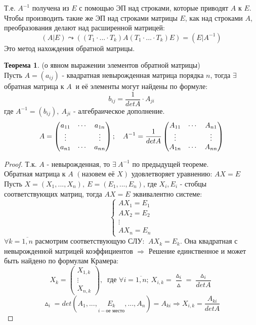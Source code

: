 \documentclass[a4paper, 12pt]{article}
\theoremstyle{definition}
\newtheorem*{theorem}{Теорема}
\begin{document}
  Т.е. $A^{-1}$ получена из $E$ с помощью ЭП над строками, которые приводят $A$ к $E$. \\
  Чтобы производить такие же ЭП над строками матрицы $E$, как над строками $A$, преобразования делают над расширенной матрицей:
  $$(A|E) \leadsto ((T_1 \cdot ... \cdot T_k)A(T_1 \cdot ... \cdot T_k)E) = (E|A^{-1})$$ 
  Это метод нахождения обратной матрицы.
  \begin{theorem}
    (о явном выражении элементов обратной матрицы) \\
    Пусть $A = (a_{ij})$ - квадратная невырожденная матрица порядка $n$, тогда $\exists$ обратная матрица к $A \ $ и её элементы могут найдены по формуле: 
    $$b_{ij} = \frac{1}{detA} \cdot A_{ji}$$
    где $A^{-1} = (b_{ij}), \ A_{ji}$ - алгебраическое дополнение. 
    $$A = \begin{pmatrix}
      a_{11} & \cdots & a_{1n} \\
      \vdots & \null & \vdots \\
      a_{n1} & \cdots & a_{nn} 
    \end{pmatrix}; \ \ \ A^{-1} = \frac{1}{detA} \begin{pmatrix}
      A_{11} & \cdots & A_{n1} \\
      \vdots  & \null & \vdots \\
      A_{1n} &  \cdots & A_{nn} 
    \end{pmatrix}$$    
  \end{theorem} 
  \begin{proof}
    Т.к. $A$ - невырожденная, то $\exists \ A^{-1}$ по предыдущей теореме. \\
    Обратная матрица к $A$ $(\text{назовем её } X)$  удовлетворяет уравнению: $AX=E$ \\
    Пусть $X = (X_1,...,X_n), \ E = (E_1,...,E_n)$, где $X_i, E_i$ - стобцы соответствующих матриц, тогда $AX = E$ эквивалентно системе:
    $$\begin{cases}
      AX_1 = E_1 \\
      AX_2 = E_2 \\
      \vdots \\
      AX_n = E_n
    \end{cases}$$    
    $\forall k = \overline{1,n}$ расмотрим соответствующую СЛУ: $ \ AX_k = E_k $. Она квадратная с невырожденной матрицей коэффициентов $\Longrightarrow $ Решение единственное и может быть найдено по формулам Крамера:
    $$X_k = \begin{pmatrix}
    X_{1,k} \\ \vdots \\ X_{n,k} \end{pmatrix}, \  \text{ где } \forall i = \overline{1,n}; \ X_{i,k} = \frac{\vartriangle_i}{\vartriangle} = \frac{\vartriangle_i}{detA}$$
    $$\vartriangle_i = det(A_1,...,\underset{i- \text{ое место}}{E_k} ,...,A_n) = A_{ki} \Longrightarrow X_{i,k} = \frac{A_{ki}}{detA}$$ 
  \end{proof} 
  
\end{document}
